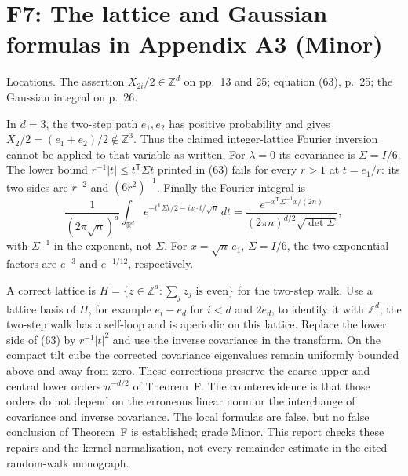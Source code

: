 \documentclass[10pt]{article}
\begin{document}
\section*{F7: The lattice and Gaussian formulas in Appendix A3 (Minor)}
Locations. The assertion \(X_{2i}/2\in\mathbb Z^d\) on pp. 13 and 25; equation (63), p. 25; the Gaussian integral on p. 26.\par
In \(d=3\), the two-step path \(e_1,e_2\) has positive probability and gives \(X_2/2=(e_1+e_2)/2\notin\mathbb Z^3\). Thus the claimed integer-lattice Fourier inversion cannot be applied to that variable as written. For \(\lambda=0\) its covariance is \(\Sigma=I/6\). The lower bound \(r^{-1}|t|\leq t^\mathsf T\Sigma t\) printed in (63) fails for every \(r>1\) at \(t=e_1/r\): its two sides are \(r^{-2}\) and \((6r^2)^{-1}\). Finally the Fourier integral is \[\frac1{(2\pi\sqrt n)^d}
 \int_{\mathbb R^d}e^{-t^\mathsf T\Sigma t/2-ix\cdot t/\sqrt n}\,dt
 =\frac{e^{-x^\mathsf T\Sigma^{-1}x/(2n)}}
 {(2\pi n)^{d/2}\sqrt{\det\Sigma}},\] with \(\Sigma^{-1}\) in the exponent, not \(\Sigma\). For \(x=\sqrt n\,e_1\), \(\Sigma=I/6\), the two exponential factors are \(e^{-3}\) and \(e^{-1/12}\), respectively.\par
A correct lattice is \(H=\{z\in\mathbb Z^d:\sum_jz_j\text{ is even}\}\) for the two-step walk. Use a lattice basis of \(H\), for example \(e_i-e_d\) for \(i<d\) and \(2e_d\), to identify it with \(\mathbb Z^d\); the two-step walk has a self-loop and is aperiodic on this lattice. Replace the lower side of (63) by \(r^{-1}|t|^2\) and use the inverse covariance in the transform. On the compact tilt cube the corrected covariance eigenvalues remain uniformly bounded above and away from zero. These corrections preserve the coarse upper and central lower orders \(n^{-d/2}\) of Theorem F. The counterevidence is that those orders do not depend on the erroneous linear norm or the interchange of covariance and inverse covariance. The local formulas are false, but no false conclusion of Theorem F is established; grade Minor. This report checks these repairs and the kernel normalization, not every remainder estimate in the cited random-walk monograph.\par
\end{document}
